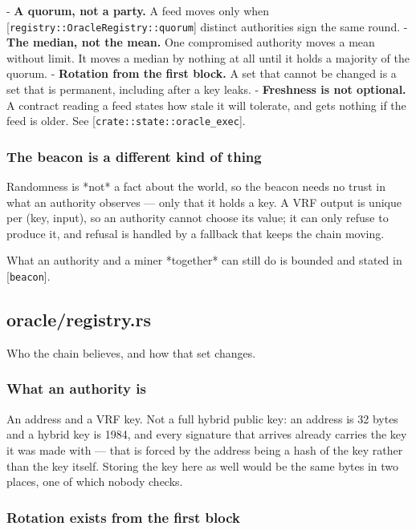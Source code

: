 \documentclass[11pt,a4paper]{article}
\begin{document}
- \textbf{A quorum, not a party.} A feed moves only when
  [\texttt{registry::OracleRegistry::quorum}] distinct authorities sign the same
  round.
- \textbf{The median, not the mean.} One compromised authority moves a mean
  without limit. It moves a median by nothing at all until it holds a
  majority of the quorum.
- \textbf{Rotation from the first block.} A set that cannot be changed is a set
  that is permanent, including after a key leaks.
- \textbf{Freshness is not optional.} A contract reading a feed states how stale
  it will tolerate, and gets nothing if the feed is older. See
  [\texttt{crate::state::oracle\_exec}].

\subsubsection{The beacon is a different kind of thing}

Randomness is *not* a fact about the world, so the beacon needs no trust in
what an authority observes — only that it holds a key. A VRF output is
unique per (key, input), so an authority cannot choose its value; it can
only refuse to produce it, and refusal is handled by a fallback that keeps
the chain moving.

What an authority and a miner *together* can still do is bounded and stated
in [\texttt{beacon}].

\subsection{oracle/registry.rs}
Who the chain believes, and how that set changes.

\subsubsection{What an authority is}

An address and a VRF key. Not a full hybrid public key: an address is 32
bytes and a hybrid key is 1984, and every signature that arrives already
carries the key it was made with — that is forced by the address being a
hash of the key rather than the key itself. Storing the key here as well
would be the same bytes in two places, one of which nobody checks.

\subsubsection{Rotation exists from the first block}
\end{document}
